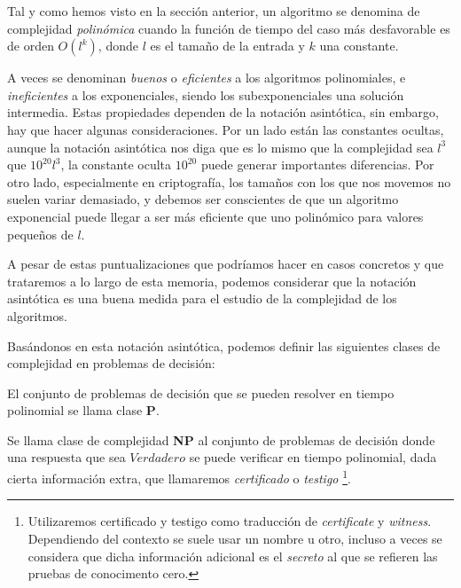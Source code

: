 Tal y como hemos visto en la secci\'on anterior, un algoritmo se denomina de complejidad {\em polin\'omica}
cuando la función de tiempo del caso más desfavorable es de orden $O(l^k)$, donde $l$ es el tamaño de la entrada y $k$ una constante.

A veces se denominan \textit{buenos} o \textit{eficientes} a los algoritmos polinomiales, e \textit{ineficientes} a los exponenciales, siendo los subexponenciales una soluci\'on intermedia.
Estas propiedades dependen de la notaci\'on asint\'otica, sin embargo, hay que hacer algunas consideraciones. Por un lado est\'an las
constantes ocultas, aunque la notaci\'on asint\'otica nos diga que es lo mismo que la complejidad sea $l^3$ que $10^{20} l^3$, la constante oculta $10^{20}$
puede generar importantes diferencias. Por otro lado, especialmente en criptograf\'ia, los tama\~nos con los que nos movemos no
suelen variar demasiado, y debemos ser conscientes de que un algoritmo exponencial puede llegar a ser m\'as eficiente que uno polin\'omico para valores peque\~nos de $l$.

A pesar de estas puntualizaciones que podr\'iamos hacer en casos concretos y que trataremos a lo largo de esta memoria, podemos considerar que la
notaci\'on asint\'otica es una buena medida para el estudio de la complejidad de los algoritmos.

Bas\'andonos en esta notaci\'on asint\'otica, podemos definir las siguientes clases de complejidad en problemas de decisi\'on:

\begin{definition}
	El conjunto de problemas de decisión que se pueden resolver en tiempo polinomial se llama clase \textbf{P}.
\end{definition}

\begin{definition}
	\label{def:NP}
	Se llama clase de complejidad \textbf{NP} al conjunto de problemas de decisión
	donde una respuesta que sea $Verdadero$ se puede verificar en tiempo polinomial,
	dada cierta información extra, que llamaremos {\em certificado} o {\em testigo}
	\footnote{Utilizaremos certificado y testigo como traducci\'on de {\em certificate} y {\em witness}.
	Dependiendo del contexto se suele usar un nombre u otro, incluso a veces se considera
	que dicha informaci\'on adicional es el {\em secreto} al que se refieren las pruebas
	de conocimento cero.}.
\end{definition}


